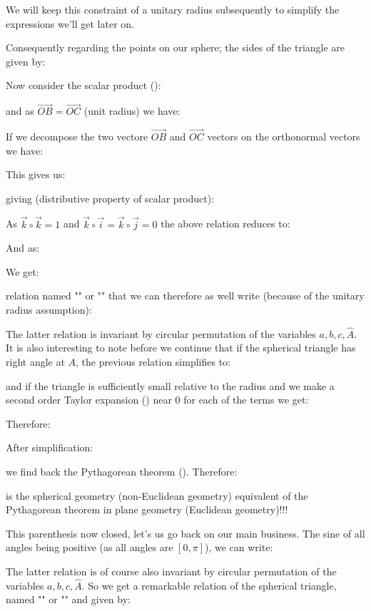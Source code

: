 	We will keep this constraint of a unitary radius subsequently to simplify the expressions we'll get later on.
	
	Consequently regarding the points on our sphere; the sides of the triangle are given by:
	
	Now consider the scalar product ():
	
	and as $\overrightarrow{OB}= \overrightarrow{OC}$ (unit radius) we have:
	
	If we decompose the two vectore $\overrightarrow{OB}$ and $\overrightarrow{OC}$ vectors on the orthonormal vectors we have:
	
	This gives us:
	
	giving (distributive property of scalar product):
	
	As $\vec{k}\circ \vec{k}=1$ and $\vec{k}\circ \vec{i}=\vec{k}\circ \vec{j}=0$ the above relation reduces to:
	
	And as:
	
	We get:
	
	relation named "" or "" that we can therefore as well write (because of the unitary radius assumption):
	
	The latter relation is invariant by circular permutation of the variables $a,b,c,\hat{A}$. It is also interesting to note before we continue that if the spherical triangle has right angle at $A$, the previous relation simplifies to:
	
	and if the triangle is sufficiently small relative to the radius and we make a second order Taylor expansion () near $0$  for each of the terms we get:
	
	Therefore:
	
	After simplification:
	
	we find back the Pythagorean theorem (). Therefore:
	
	is the spherical geometry (non-Euclidean geometry) equivalent  of the Pythagorean theorem in plane geometry (Euclidean geometry)!!!
	
	This  parenthesis now closed, let's us go back on our main business. The sine of all angles being positive (as all angles are $[0,\pi]$), we can write:
	
	The latter relation is of course also invariant by circular permutation of the variables $a,b,c,\hat{A}$. So we get a remarkable relation of the spherical triangle, named "" or "" and given by:
	
